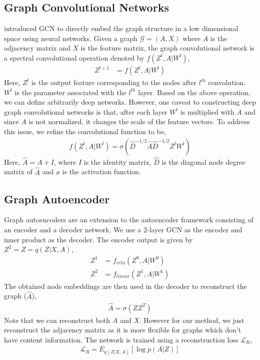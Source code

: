 \documentclass{article}
\begin{document}
\subsection{Graph Convolutional Networks}
\cite{kipf2016semi} introduced GCN to directly embed the graph structure in a low dimensional space using neural networks. Given a graph $\mathcal{G} = (A, X)$ where $A$ is the adjacency matrix and $X$ is the feature matrix, the graph convolutional network is a spectral convolutional operation denoted by $f(Z^l, A|W^l)$,
\begin{align}
    Z^{l+1} &= f(Z^l, A|W^l)
\end{align}
Here, $Z^l$ is the output feature corresponding to the nodes after $l^{th}$ convolution. $W^l$ is the parameter associated with the $l^{th}$ layer. Based on the above operation, we can define arbitrarily deep networks. However, one caveat to constructing deep graph convolutional networks is that, after each layer $W^l$ is multiplied with $A$ and since $A$ is not normalized, it changes the scale of the feature vectors. To address this issue, we refine the convolutional function to be,
\begin{align}
    f(Z^l, A|W^l) = \sigma(\hat{D}^{-1/2}\hat{A}\hat{D}^{-1/2}Z^lW^l)
\end{align}
Here,  $\hat{A} = A + I$, where $I$ is the identity matrix, $\hat{D}$ is the diagonal node degree matrix of $\hat{A}$ and $\sigma$ is the activation function.

\subsection{Graph Autoencoder}
Graph autoencoders are an extension to the autoencoder framework consisting of an encoder and a decoder network. We use a 2-layer GCN as the encoder and inner product as the decoder. The encoder output is given by $Z^2 = Z = q(Z|X,A)$,
\begin{align}
    Z^1 &= f_{relu}(Z^0, A|W^0)\\
    Z^2 &= f_{linear}(Z^1, A|W^1)
\end{align}
The obtained node embeddings are then used in the decoder to reconstruct the graph ($\hat{A}$),
\begin{align} \label{reconstruct}
    \hat{A} = \sigma(ZZ^T)
\end{align}
Note that we can reconstruct both $A$ and $X$. However for our method, we just reconstruct the adjacency matrix as it is more flexible for graphs which don't have content information.
The network is trained using a reconstruction loss $\mathcal{L}_R$,
\begin{align}\label{llr}
    \mathcal{L}_R = E_{q(Z|X,A)}[\log p(A|Z)]
\end{align}
\end{document}
